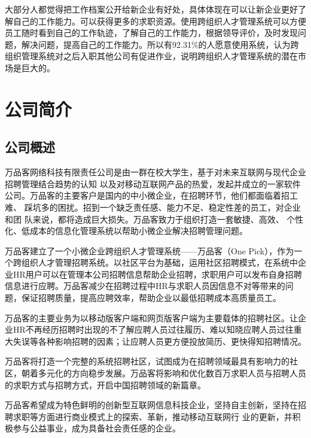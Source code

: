 \documentclass[master]{hduthesis}
\begin{document}
大部分人都觉得把工作档案公开给新企业有好处，具体体现在可以让新企业更好了解自己的工作能力。可以获得更多的求职资源。使用跨组织人才管理系统可以方便员工随时看到自己的工作轨迹，了解自己的工作能力，根据领导评价，及时发现问题，解决问题，提高自己的工作能力。所以有92.31\%的人愿意使用系统，认为跨组织管理系统对之后入职其他公司有促进作业，说明跨组织人才管理系统的潜在市场是巨大的。

\section{公司简介}
\subsection{公司概述}
万品客网络科技有限责任公司是由一群在校大学生，基于对未来互联网与现代企业招聘管理结合趋势的认知 以及对移动互联网产品的热爱，发起并成立的一家软件公司。万品客的主要客户是国内的中小微企业，在招聘环节，他们都面临着招工难、 踩坑多的困扰。招到一个缺乏责任感、能力不足、稳定性差的员工，对企业和团 队来说，都将造成巨大损失。万品客致力于组织打造一套敏捷、高效、 个性化、低成本的信息化管理系统以帮助小微企业解决招聘管理问题。

万品客建立了一个小微企业跨组织人才管理系统——万品客（One Pick），作为一个跨组织人才管理招聘系统。以社区平台为基础，运用社区招聘模式，在系统中企业HR用户可以在管理本公司招聘信息帮助企业招聘，求职用户可以发布自身招聘信息进行应聘。万品客减少在招聘过程中HR与求职人员因信息不对等带来的问题，保证招聘质量，提高应聘效率，帮助企业以最低招聘成本高质量员工。

万品客的主要业务为以移动版客户端和网页版客户端为主要载体的招聘社区。让企业HR不再经历招聘时出现的不了解应聘人员过往履历、难以知晓应聘人员过往重大失误等各种影响招聘的因素；让应聘人员更方便投放简历、更快得知招聘情况。

万品客将打造一个完整的系统招聘社区，试图成为在招聘领域最具有影响力的社区，朝着多元化的方向稳步发展。万品客将影响和优化数百万求职人员与招聘人员的求职方式与招聘方式，开启中国招聘领域的新篇章。

万品客希望成为特色鲜明的创新型互联网信息科技企业，坚持自主创新，坚持在招聘求职等方面进行商业模式上的探索、革新，推动移动互联网行 业的更新，并积极参与公益事业，成为具备社会责任感的企业。
\end{document}
